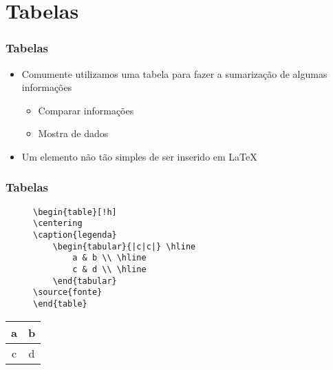 \section{Tabelas}

\begin{frame}[fragile] \frametitle{Tabelas}
\begin{itemize}
	\item Comumente utilizamos uma tabela para fazer a sumarização de algumas informações
	\begin{itemize}
		\item Comparar informações
		\item Mostra de dados
	\end{itemize}
	\item Um elemento não tão simples de ser inserido em LaTeX
\end{itemize}
\end{frame}

\begin{frame}[fragile] \frametitle{Tabelas}
\begin{figure}[!t]
\begin{lstlisting}
\begin{table}[!h]
\centering
\caption{legenda}
	\begin{tabular}{|c|c|} \hline
		a & b \\ \hline
		c & d \\ \hline
	\end{tabular}
\source{fonte}
\end{table}
\end{lstlisting}
\end{figure}
\begin{table}[!h]
\centering
\begin{tabular}{|c|c|} \hline
	a & b \\ \hline
	c & d \\ \hline
\end{tabular}
\end{table}
\end{frame}

